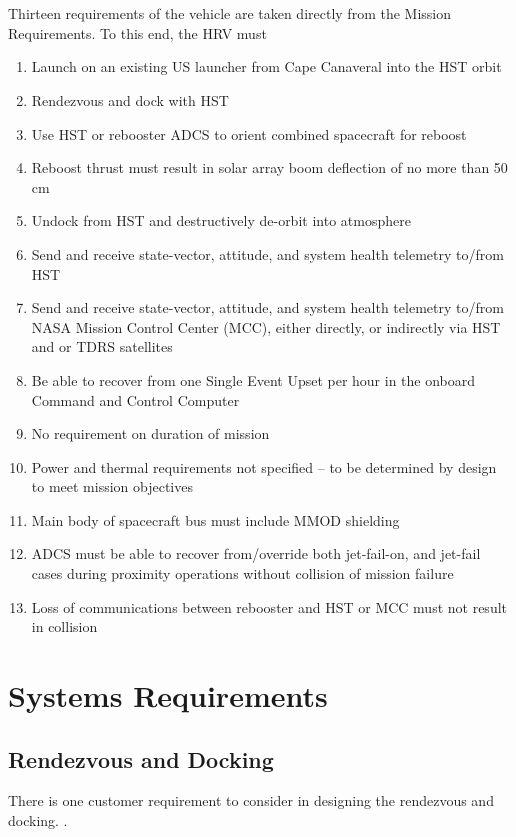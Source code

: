 \documentclass[onecolumn,10pt]{jhwhw}
\begin{document}
 \\
\\
Thirteen requirements of the vehicle are taken directly from the Mission Requirements. To this end, the HRV must
\begin{enumerate}
\item Launch on an existing US launcher from Cape Canaveral into the HST orbit
\item Rendezvous and dock with HST
\item Use HST or rebooster ADCS to orient combined spacecraft for reboost
\item Reboost thrust must result in solar array boom deflection of no more than 50 cm
\item Undock from HST and destructively de-orbit into atmosphere
\item Send and receive state-vector, attitude, and system health telemetry to/from HST
\item Send and receive state-vector, attitude, and system health telemetry to/from NASA Mission Control Center (MCC), either directly, or indirectly via HST and or TDRS satellites
\item Be able to recover from one Single Event Upset per hour in the onboard Command and Control Computer
\item No requirement on duration of mission
\item Power and thermal requirements not specified – to be determined by design to meet mission objectives
\item Main body of spacecraft bus must include MMOD shielding
\item ADCS must be able to recover from/override both jet-fail-on, and jet-fail cases during proximity operations without collision of mission failure
\item Loss of communications between rebooster and HST or MCC must not result in collision
\end{enumerate}

\section{Systems Requirements}
\subsection{Rendezvous and Docking}
There is one customer requirement to consider in designing the rendezvous and docking. .
\end{document}
